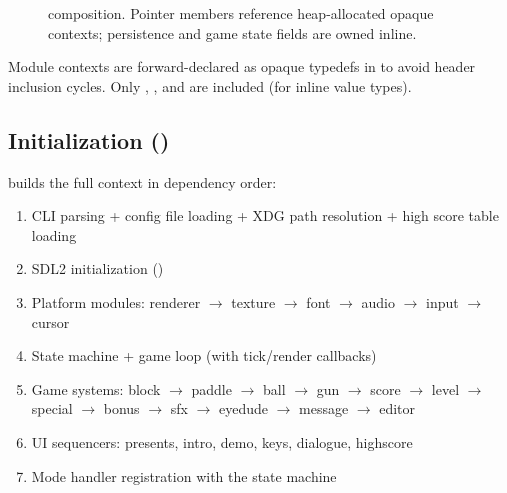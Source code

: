 \documentclass[11pt,a4paper]{article}
\begin{document}
\begin{figure}[h]
\caption{ composition. Pointer members reference heap-allocated opaque contexts; persistence and game state fields are owned inline.}
\label{fig:game-context}
\end{figure}

Module contexts are forward-declared as opaque typedefs in  to avoid header inclusion cycles. Only , , and  are included (for inline value types).

\subsection{Initialization ()}
\label{sec:game-init}

 builds the full context in dependency order:

\begin{enumerate}[nosep]
    \item CLI parsing + config file loading + XDG path resolution + high score table loading
    \item SDL2 initialization ()
    \item Platform modules: renderer $\rightarrow$ texture $\rightarrow$ font $\rightarrow$ audio $\rightarrow$ input $\rightarrow$ cursor
    \item State machine + game loop (with tick/render callbacks)
    \item Game systems: block $\rightarrow$ paddle $\rightarrow$ ball $\rightarrow$ gun $\rightarrow$ score $\rightarrow$ level $\rightarrow$ special $\rightarrow$ bonus $\rightarrow$ sfx $\rightarrow$ eyedude $\rightarrow$ message $\rightarrow$ editor
    \item UI sequencers: presents, intro, demo, keys, dialogue, highscore
    \item Mode handler registration with the state machine
\end{enumerate}
\end{document}
